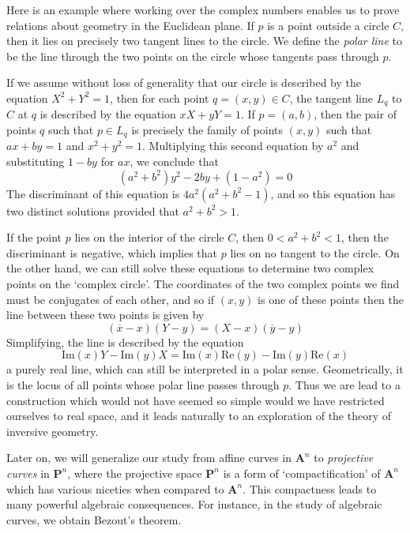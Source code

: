 \begin{example}
    Here is an example where working over the complex numbers enables us to prove relations about geometry in the Euclidean plane. If $p$ is a point outside a circle $C$, then it lies on precisely two tangent lines to the circle. We define the \emph{polar line} to be the line through the two points on the circle whose tangents pass through $p$.

    If we assume without loss of generality that our circle is described by the equation $X^2 + Y^2 = 1$, then for each point $q = (x,y) \in C$, the tangent line $L_q$ to $C$ at $q$ is described by the equation $xX + yY = 1$. If $p = (a,b)$, then the pair of points $q$ such that $p \in L_q$ is precisely the family of points $(x,y)$ such that $ax + by = 1$ and $x^2 + y^2 = 1$. Multiplying this second equation by $a^2$ and substituting $1 - by$ for $ax$, we conclude that
    \[ (a^2 + b^2)y^2 - 2by + (1 - a^2) = 0 \]
    The discriminant of this equation is $4a^2(a^2 + b^2 - 1)$, and so this equation has two distinct solutions provided that $a^2 + b^2 > 1$.

    If the point $p$ lies on the interior of the circle $C$, then $0 < a^2 + b^2 < 1$, then the discriminant is negative, which implies that $p$ lies on no tangent to the circle. On the other hand, we can still solve these equations to determine two complex points on the `complex circle'. The coordinates of the two complex points we find must be conjugates of each other, and so if $(x,y)$ is one of these points then the line between these two points is given by
    \[ (\overline{x} - x)(Y - y) = (X - x)(\overline{y} - y) \]
    Simplifying, the line is described by the equation
    \[ \text{Im}(x) Y - \text{Im}(y) X = \text{Im}(x) \text{Re}(y) - \text{Im}(y) \text{Re}(x) \]
    a purely real line, which can still be interpreted in a polar sense. Geometrically, it is the locus of all points whose polar line passes through $p$. Thus we are lead to a construction which would not have seemed so simple would we have restricted ourselves to real space, and it leads naturally to an exploration of the theory of inversive geometry.
\end{example}

Later on, we will generalize our study from affine curves in $\mathbf{A}^n$ to \emph{projective curves} in $\mathbf{P}^n$, where the projective space $\mathbf{P}^n$ is a form of `compactification' of $\mathbf{A}^n$ which has various niceties when compared to $\mathbf{A}^n$. This compactness leads to many powerful algebraic consequences. For instance, in the study of algebraic curves, we obtain Bezout's theorem.

